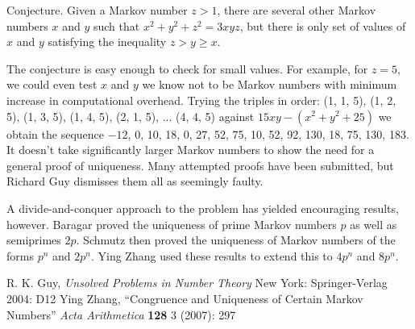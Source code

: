 \documentclass[12pt]{article}
\begin{document}
Conjecture. Given a Markov number $z > 1$, there are several other Markov numbers $x$ and $y$ such that $x^2 + y^2 + z^2 = 3xyz$, but there is only set of values of $x$ and $y$ satisfying the inequality $z > y \geq x$.

The conjecture is easy enough to check for small values. For example, for $z = 5$, we could even test $x$ and $y$ we know not to be Markov numbers with minimum increase in computational overhead. Trying the triples in order: (1, 1, 5), (1, 2, 5), (1, 3, 5), (1, 4, 5), (2, 1, 5), ... (4, 4, 5) against $15xy - (x^2 + y^2 + 25)$ we obtain the sequence $-12$, 0, 10, 18, 0, 27, 52, 75, 10, 52, 92, 130, 18, 75, 130, 183. It doesn't take significantly larger Markov numbers to show the need for a general proof of uniqueness. Many attempted proofs have been submitted, but Richard Guy dismisses them all as seemingly faulty.

A divide-and-conquer approach to the problem has yielded encouraging results, however. Baragar proved the uniqueness of prime Markov numbers $p$ as well as semiprimes $2p$. Schmutz then proved the uniqueness of Markov numbers of the forms $p^n$ and $2p^n$. Ying Zhang used these results to extend this to $4p^n$ and $8p^n$.

\begin{thebibliography}{2}
 R. K. Guy, {\it Unsolved Problems in Number Theory} New York: Springer-Verlag 2004: D12
 Ying Zhang, ``Congruence and Uniqueness of Certain Markov Numbers'' {\it Acta Arithmetica} {\bf 128} 3 (2007): 297
\end{thebibliography}

\end{document}
